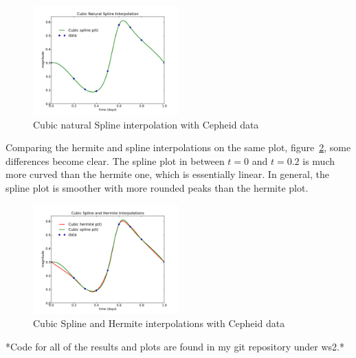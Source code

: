 \documentclass[11pt,letterpaper]{article}
\begin{document}
\begin{figure}[bth]
\centering
\includegraphics[width=0.5\textwidth]{spline_interpolation.pdf}
\caption{Cubic natural Spline interpolation with Cepheid data}
\label{fig:spline}
\end{figure}

Comparing the hermite and spline interpolations on the same plot,
figure~\ref{fig:herm-spl}, some differences become clear. The spline plot 
in between $t=0$ and $t=0.2$ is much more curved than the hermite one, which is
essentially linear. In general, the spline plot is smoother with more
rounded peaks than the hermite plot.

\begin{figure}[bth]
\centering
\includegraphics[width=0.5\textwidth]{hermite_spline_interpolation.pdf}
\caption{Cubic Spline and Hermite interpolations with Cepheid data}
\label{fig:herm-spl}
\end{figure}




*Code for all of the results and plots are found in my git repository under
ws2.*
\end{document}
